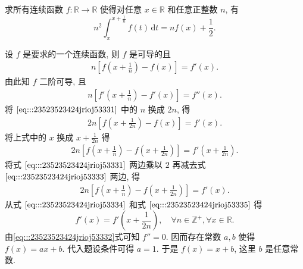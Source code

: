 \documentclass[../../main.tex]{subfiles}%
\begin{document}
\begin{example}
求所有连续函数 \( f : \mathbb{R} \to \mathbb{R} \) 使得对任意 \( x \in \mathbb{R} \) 和任意正整数 \( n \), 有  
\[
n^2 \int_{x}^{x + \frac{1}{n}} f(t) \, \mathrm{d}t = n f(x) + \frac{1}{2}.
\]  
\end{example}
\begin{solution}
设 \( f \) 是要求的一个连续函数, 则 \( f \) 是可导的且  
\begin{align}
n \left[ f \left( x + \frac{1}{n} \right) - f(x) \right] = f'(x). \label{eq:::23523523424jrioj53331}
\end{align}  
由此知 \( f \) 二阶可导, 且  
\begin{align}
n \left[ f' \left( x + \frac{1}{n} \right) - f'(x) \right] = f''(x). \label{eq:::23523523424jrioj53332}
\end{align}  
将 \(\eqref{eq:::23523523424jrioj53331}\) 中的 \( n \) 换成 \( 2n \), 得  
\begin{align}
2n \left[ f \left( x + \frac{1}{2n} \right) - f(x) \right] = f'(x). \label{eq:::23523523424jrioj53333}
\end{align}  
将上式中的 \( x \) 换成 \( x + \frac{1}{2n} \) 得  
\begin{align}
2n \left[ f \left( x + \frac{1}{n} \right) - f \left( x + \frac{1}{2n} \right) \right] = f' \left( x + \frac{1}{2n} \right). \label{eq:::23523523424jrioj53334}
\end{align}  
将式 \(\eqref{eq:::23523523424jrioj53331}\) 两边乘以 \( 2 \) 再减去式 \(\eqref{eq:::23523523424jrioj53333}\) 两边, 得  
\begin{align}
2n \left[ f \left( x + \frac{1}{n} \right) - f \left( x + \frac{1}{2n} \right) \right] = f'(x). \label{eq:::23523523424jrioj53335}
\end{align}  
从式 \(\eqref{eq:::23523523424jrioj53334}\) 和式 \(\eqref{eq:::23523523424jrioj53335}\) 得  
\[
f'(x) = f' \left( x + \frac{1}{2n} \right), \quad \forall n \in \mathbb{Z}^+, \forall x \in \mathbb{R}.
\]  
由\eqref{eq:::23523523424jrioj53332}式可知 \( f'' = 0 \). 因而存在常数 \( a, b \) 使得 \( f(x) = ax + b \). 代入题设条件可得 \( a = 1 \). 于是 \( f(x) = x + b \), 这里 \( b \) 是任意常数.

\end{solution}
\end{document}
